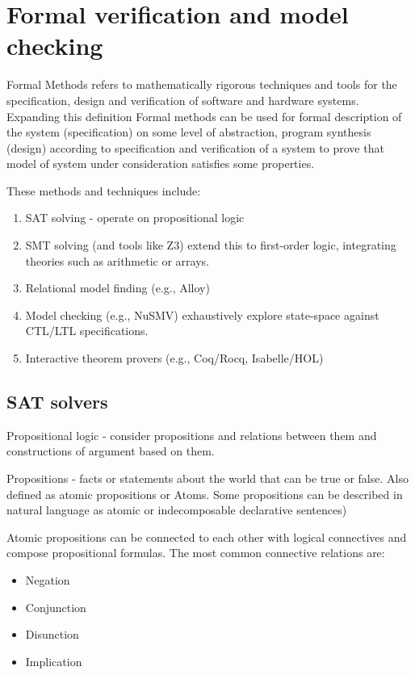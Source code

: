 \section {Formal verification and model checking}
Formal Methods refers to mathematically rigorous techniques and
tools for the specification, design and verification of software and
hardware systems.\\ 
Expanding this definition Formal methods 
can be used for formal description of the system (specification) 
on some level of abstraction, program synthesis (design) according to specification
and verification of a system to prove that model of system under consideration 
satisfies some properties.


These methods and techniques include:
\begin{enumerate}

    \item SAT solving - operate on propositional logic 

    \item SMT solving (and tools like Z3) extend this to first-order logic,
        integrating theories such as arithmetic or arrays.

    \item Relational model finding (e.g., Alloy) 

    \item Model checking (e.g., NuSMV) exhaustively explore state-space against CTL/LTL specifications.

    \item Interactive theorem provers (e.g., Coq/Rocq, Isabelle/HOL) 
\end{enumerate}


\subsection {SAT solvers}

Propositional logic - consider  propositions and relations between them and constructions of argument based on them.

Propositions - facts or statements about the world  that can be true or false. Also defined as atomic propositions or Atoms.
Some propositions can be described in natural language as atomic or indecomposable declarative sentences)

Atomic propositions can be connected to each other with logical connectives and compose propositional formulas.
The most common connective relations are:
\begin{itemize}
    \item Negation
    \item Conjunction
    \item Disunction
    \item Implication
\end{itemize}

